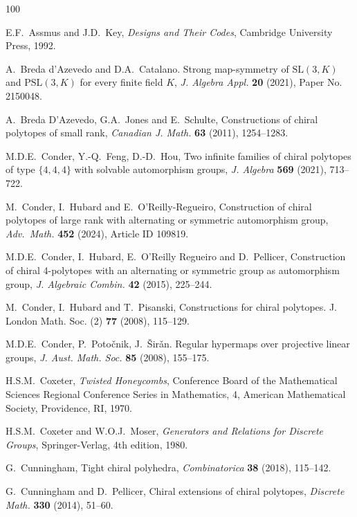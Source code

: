 \documentclass[12pt]{article}
\theoremstyle{definition}\newtheorem{definition}{Definition}[section]
\begin{document}
\begin{thebibliography}{100}

E.F.~Assmus and J.D.~Key, \textit{Designs and Their Codes}, Cambridge University Press, 1992.

A.~Breda d’Azevedo and D.A.~Catalano. Strong map-symmetry of $\mathrm{SL}(3,K)$ and $\mathrm{PSL}(3,K)$ for every finite field $K$, \textit{J. Algebra Appl.} {\bf 20} (2021), Paper No. 2150048.

 A.~Breda D’Azevedo, G.A.~Jones and E.~Schulte, Constructions of chiral polytopes of small rank, \textit{Canadian J. Math.} {\bf 63} (2011), 1254--1283.

M.D.E.~Conder, Y.-Q.~Feng, D.-D.~Hou, Two infinite families of chiral polytopes of type $\{4, 4, 4\}$ with solvable automorphism groups, \textit{J. Algebra} {\bf 569} (2021), 713--722.

M.~Conder, I.~Hubard and E.~O'Reilly-Regueiro, Construction of chiral polytopes of large rank with alternating or symmetric automorphism group, \textit{Adv.\ Math.} {\bf 452} (2024), Article ID 109819.

M.D.E.~Conder, I.~Hubard, E.~O’Reilly Regueiro and D.~Pellicer, Construction of chiral 4-polytopes with an alternating or symmetric group as automorphism group, \textit{J. Algebraic Combin.} {\bf 42} (2015), 225--244.

M.~Conder, I.~Hubard and T.~Pisanski, Constructions for chiral polytopes. J. London Math. Soc. (2) {\bf 77} (2008), 115--129.

M.D.E.~Conder, P.~Poto\v{c}nik, J.~\v{S}ir\v{a}n. Regular hypermaps over projective linear groups, \textit{J. Aust. Math. Soc.} {\bf 85} (2008), 155--175.

H.S.M.~Coxeter, \textit{Twisted Honeycombs}, Conference Board of the Mathematical Sciences Regional Conference Series in Mathematics, 4, American Mathematical Society, Providence, RI, 1970.

H.S.M.~Coxeter and W.O.J.~Moser, \textit{Generators and Relations for Discrete Groups}, Springer-Verlag, 4th edition, 1980.

G.~Cunningham, Tight chiral polyhedra, \textit{Combinatorica} {\bf 38} (2018), 115--142.

G.~Cunningham and D.~Pellicer, Chiral extensions of chiral polytopes, \textit{Discrete Math.}
{\bf 330} (2014), 51--60.


\end{thebibliography}
\end{document}
